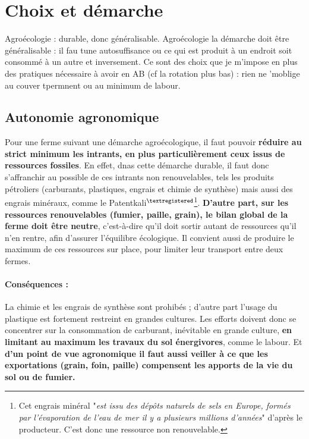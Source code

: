 \documentclass{book}
\begin{document}
\section{Choix et démarche}

Agroécologie : durable, donc généralisable.
Agroécologie la démarche doit être généralisable : il fau tune autosuffisance ou ce qui est produit à un endroit soit consommé à un autre et inversement.
Ce sont des choix que je m'impose en plus des pratiques nécessaire à avoir en AB (cf la rotation plus bas) : rien ne 'moblige au couver tpermnent ou au minimum de labour.

\subsection{Autonomie agronomique}

Pour une ferme suivant une démarche agroécologique, il faut pouvoir \textbf{réduire au strict minimum les intrants, en plus particulièrement ceux issus de ressources fossiles}. En effet, dnas cette démarche durable, il faut donc s'affranchir au possible de ces intrants non renouvelables, tels les produits pétroliers (carburants, plastiques, engrais et chimie de synthèse) mais aussi des engrais minéraux, comme le Patentkali$^\mathrm{\textregistered}$\footnote{Cet engrais minéral "\textit{est issu des dépôts naturels de sels en Europe, formés par l’évaporation de l’eau de mer il y a plusieurs millions d’années}" d'après le producteur. C'est donc une ressource non renouvelable.}. \textbf{D'autre part, sur les ressources renouvelables (fumier, paille, grain), le bilan global de la ferme doit être neutre}, c'est-à-dire qu'il doit sortir autant de ressources qu'il n'en rentre, afin d'assurer l'équilibre écologique. Il convient aussi de produire le maximum de ces ressources sur place, pour limiter leur transport entre deux fermes.

\paragraph{Conséquences :} La chimie et les engrais de synthèse sont prohibés ; d'autre part l'usage du plastique est fortement restreint en grandes cultures. Les efforts doivent donc se concentrer sur la consommation de carburant, inévitable en grande culture, \textbf{en limitant au maximum les travaux du sol énergivores}, comme le labour. Et \textbf{d'un point de vue agronomique il faut aussi veiller à ce que les exportations (grain, foin, paille) compensent les apports de la vie du sol ou de fumier.}
\end{document}
